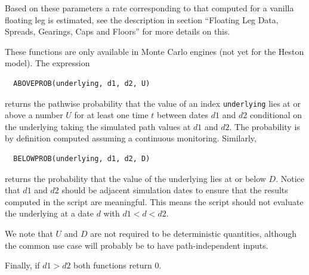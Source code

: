 Based on these parameters a rate corresponding to that computed for a vanilla floating leg is estimated, see the
description in section ``Floating Leg Data, Spreads, Gearings, Caps and Floors'' for more details on this.

\label{function_aboveprob}

These functions are only available in Monte Carlo engines (not yet for the Heston model). The expression

\begin{verbatim}
  ABOVEPROB(underlying, d1, d2, U)
\end{verbatim}

returns the pathwise probability that the value of an index \verb+underlying+ lies at or above a number $U$ for at least
one time $t$ between dates $d1$ and $d2$ conditional on the underlying taking the simulated path values at $d1$ and
$d2$. The probability is by definition computed assuming a continuous monitoring. Similarly,

\begin{verbatim}
  BELOWPROB(underlying, d1, d2, D)
\end{verbatim}

returns the probability that the value of the underlying lies at or below $D$. Notice that $d1$ and $d2$ should be
adjacent simulation dates to ensure that the results computed in the script are meaningful. This means the script should
not evaluate the underlying at a date $d$ with $d1 < d < d2$.

We note that $U$ and $D$ are not required to be deterministic quantities, although the common use case will probably be
to have path-independent inputs.

Finally, if $d1>d2$ both functions return $0$.
